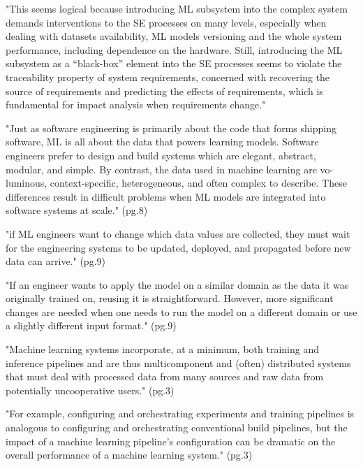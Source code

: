 "This seems logical because introducing ML subsystem into the complex system
demands interventions to the SE processes on many levels, especially when
dealing with datasets availability, ML models versioning and the whole system
performance, including dependence on the hardware. Still, introducing the ML
subsystem as a “black-box” element into the SE processes seems to violate the
traceability property of system requirements, concerned with recovering the
source of requirements and predicting the effects of requirements, which is
fundamental for impact analysis when requirements change."

"Just as software engineering is primarily about the code that forms shipping
software, ML is all about the data that powers learning models. Software
engineers prefer to design and build systems which are elegant, abstract,
modular, and simple. By contrast, the data used in machine learning are vo-
luminous, context-specific, heterogeneous, and often complex to describe. These
differences result in difficult problems when ML models are integrated into
software systems at scale." (pg.8)

"if ML engineers want to change which data values are collected, they must wait
for the engineering systems to be updated, deployed, and propagated before new
data can arrive." (pg.9)

"If an engineer wants to apply the model on a similar domain as the data it was
originally trained on, reusing it is straightforward. However, more significant
changes are needed when one needs to run the model on a different domain or use
a slightly different input format." (pg.9)


\parencite{Benton2020MachineApplications}

"Machine learning systems incorporate, at a minimum, both training and inference
pipelines and are thus multicomponent and (often) distributed systems that must
deal with processed data from many sources and raw data from
potentially uncooperative users." (pg.3)

"For example, configuring and orchestrating experiments and training pipelines
is analogous to configuring and orchestrating conventional build pipelines,
but the impact of a machine learning pipeline’s configuration can be dramatic
on the overall performance of a machine learning system." (pg.3)

